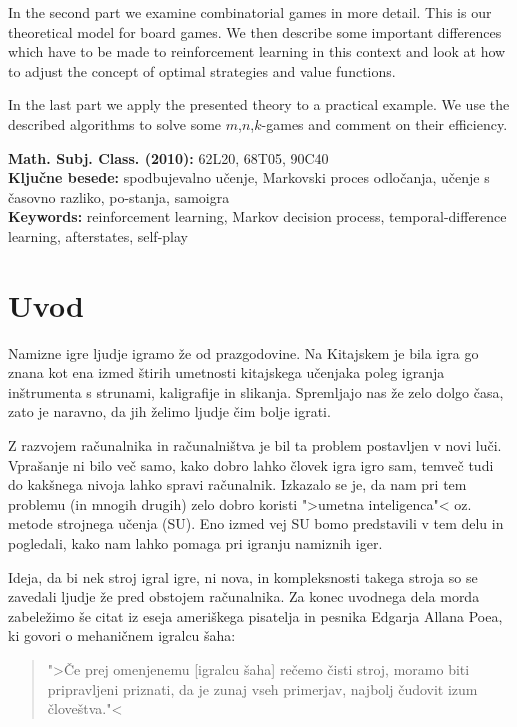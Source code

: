 \documentclass[12pt,a4paper]{amsart}
\theoremstyle{definition} %
\theoremstyle{plain} %
\begin{document}
In the second part we examine combinatorial games in more detail. This is our theoretical model for board 
games. We then describe some important differences which have to be made to reinforcement learning in 
this context and look at how to adjust the concept of optimal strategies and value functions.

In the last part we apply the presented theory to a practical example. We use the described algorithms to 
solve some $m$,$n$,$k$-games and comment on their efficiency.

\vfill\noindent
{\bf Math. Subj. Class. (2010):} 62L20, 68T05, 90C40  \\[1mm]  %
{\bf Ključne besede:} spodbujevalno učenje, Markovski proces odločanja, učenje s časovno razliko, 
                      po-stanja, samoigra \\[1mm]  
{\bf Keywords:} reinforcement learning, Markov decision process, temporal-difference learning,  
                afterstates, self-play
\pagebreak



\section{Uvod}
Namizne igre ljudje igramo že od prazgodovine. Na Kitajskem je bila igra go znana kot ena 
izmed štirih umetnosti kitajskega učenjaka poleg igranja inštrumenta s strunami, kaligrafije
in slikanja. Spremljajo nas že zelo dolgo časa, zato je naravno, da jih želimo ljudje čim
bolje igrati.

Z razvojem računalnika in računalništva je bil ta problem postavljen v novi luči. Vprašanje
ni bilo več samo, kako dobro lahko človek igra igro sam, temveč tudi do kakšnega nivoja 
lahko spravi računalnik. Izkazalo se je, da nam pri tem problemu (in mnogih drugih) zelo dobro
koristi ">umetna inteligenca"< oz. metode strojnega učenja (SU). Eno izmed vej SU bomo 
predstavili v tem delu in pogledali, kako nam lahko pomaga pri igranju namiznih iger.

Ideja, da bi nek stroj igral igre, ni nova, in kompleksnosti takega stroja so se zavedali ljudje
že pred obstojem računalnika. 
Za konec uvodnega dela morda zabeležimo še citat iz eseja ameriškega pisatelja in pesnika 
Edgarja Allana Poea, ki govori o mehaničnem igralcu šaha: 

\begin{quotation}
    ">Če prej omenjenemu [igralcu šaha] rečemo čisti stroj, moramo biti pripravljeni priznati, da je
    zunaj vseh primerjav, najbolj čudovit izum človeštva."<
\end{quotation}
\end{document}

